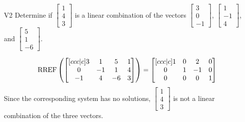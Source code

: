 \begin{problem}{V2} 
Determine if \(\begin{bmatrix} 1 \\ 4 \\ 3 \end{bmatrix}\) is a linear combination of the vectors \(\begin{bmatrix} 3 \\ 0 \\ -1 \end{bmatrix}\), \(\begin{bmatrix} 1 \\ -1 \\ 4 \end{bmatrix}\), and \(\begin{bmatrix} 5 \\ 1 \\  -6 \end{bmatrix}\).
\end{problem}
\begin{solution}
\[\operatorname{RREF}\left(\begin{bmatrix}[ccc|c] 3 & 1 & 5 & 1 \\ 0 & -1 & 1 & 4 \\ -1 & 4 & -6 & 3 \end{bmatrix} \right) = \begin{bmatrix}[ccc|c] 1 & 0 & 2 & 0 \\ 0 & 1 & -1 & 0 \\ 0 & 0 & 0 & 1 \end{bmatrix}\]
Since the corresponding system has no solutions, \(\begin{bmatrix} 1 \\ 4 \\ 3 \end{bmatrix}\) is not a linear combination of the three vectors.
\end{solution}


